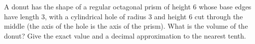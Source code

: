A donut has the shape of a regular octagonal prism of height $6$ whose base edges have length $3$, with a cylindrical hole of radius $3$ and height $6$ cut through the middle (the axis of the hole is the axis of the prism). What is the volume of the donut? Give the exact value and a decimal approximation to the nearest tenth.
